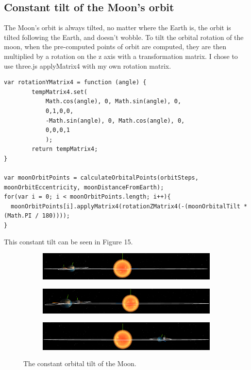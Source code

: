 \documentclass[12pt]{article}
\begin{document}
\subsection{Constant tilt of the Moon's orbit}

The Moon's orbit is always tilted, no matter where the Earth is, the orbit is tilted following the Earth, and doesn't wobble. To tilt the orbital rotation of the moon, when the pre-computed points of orbit are computed, they are then multiplied by a rotation on the z axis with a transformation matrix. I chose to use three.js applyMatrix4 with my own rotation matrix.

\begin{lstlisting}
var rotationYMatrix4 = function (angle) {     
        tempMatrix4.set(
            Math.cos(angle), 0, Math.sin(angle), 0,
            0,1,0,0,
            -Math.sin(angle), 0, Math.cos(angle), 0,
            0,0,0,1
            );
        return tempMatrix4;
}

var moonOrbitPoints = calculateOrbitalPoints(orbitSteps, moonOrbitEccentricity, moonDistanceFromEarth);
for(var i = 0; i < moonOrbitPoints.length; i++){
  moonOrbitPoints[i].applyMatrix4(rotationZMatrix4(-(moonOrbitalTilt * (Math.PI / 180))));
}
\end{lstlisting}

This constant tilt can be seen in Figure 15.

\begin{figure}[H]
 \centering
        \begin{subfigure}[b]{0.9\textwidth}
                \includegraphics[width=\textwidth]{images/moonorbitaltilt1}
                \label{fig: Moon orbital tilt 1.}
	 \end{subfigure}
        \begin{subfigure}[b]{0.9\textwidth}
                \includegraphics[width=\textwidth]{images/moonorbitaltilt2}
                \label{fig: Moon orbital tilt 2.}
	 \end{subfigure}
	  \begin{subfigure}[b]{0.9\textwidth}
                \includegraphics[width=\textwidth]{images/moonorbitaltilt3}
                \label{fig: Moon orbital tilt 3.}
	 \end{subfigure}
	 \caption{The constant orbital tilt of the Moon.}
\end{figure}
\end{document}
